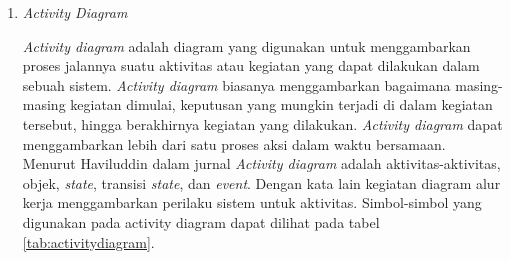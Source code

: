 \begin{enumerate}
\begin{table}[h!]
\begin{tabular} { |>{\centering\arraybackslash}p{5cm}|p{6cm}| }
\end{tabular}
\end{table}

	\item \textit{Activity Diagram}

	\textit{Activity diagram} adalah diagram yang digunakan untuk menggambarkan proses jalannya suatu aktivitas atau kegiatan yang dapat dilakukan dalam sebuah sistem. \textit{Activity diagram} biasanya menggambarkan bagaimana masing-masing kegiatan dimulai, keputusan yang mungkin terjadi di dalam kegiatan tersebut, hingga berakhirnya kegiatan yang dilakukan. \textit{Activity diagram} dapat menggambarkan lebih dari satu proses aksi dalam waktu bersamaan. Menurut Haviluddin dalam jurnal \cite{Suendri2018} \textit{Activity diagram} adalah aktivitas-aktivitas, objek, \textit{state}, transisi \textit{state}, dan \textit{event}. Dengan kata lain kegiatan diagram alur kerja menggambarkan perilaku sistem untuk aktivitas. Simbol-simbol yang digunakan pada activity diagram dapat dilihat pada tabel \ref{tab:activitydiagram}.


\end{enumerate}
